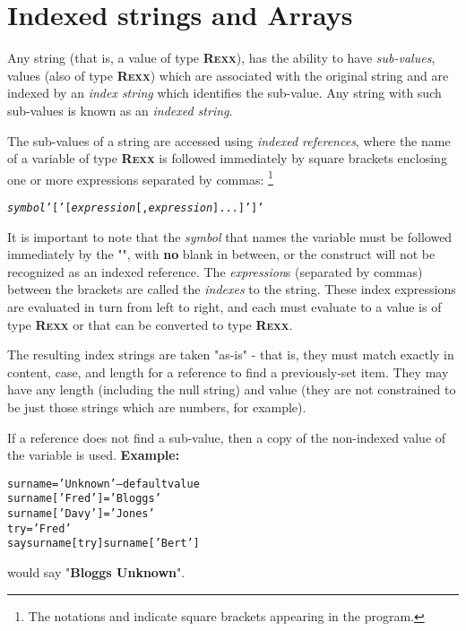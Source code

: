 \chapter{Indexed strings and Arrays}\label{refinstr}
 
Any \nr{} string (that is, a value of type \textbf{R\textsc{exx}}), has the
ability to have \emph{sub-values}, values (also of type \textbf{R\textsc{exx}})
which are associated with the original string and are indexed by an
\emph{index string} which identifies the sub-value.
Any string with such sub-values is known as an \emph{indexed string}.
 
The sub-values of a \nr{} string are accessed using \emph{indexed
references}, where the name of a variable of type \textbf{R\textsc{exx}} is
followed immediately by square brackets enclosing one or more
expressions separated by commas:
\footnote{
The notations \keyword{'['} and \keyword{']'}
indicate square brackets appearing in the \nr{} program.
}
\begin{shaded}
\begin{alltt}
\emph{symbol}'['[\emph{expression}[, \emph{expression}]...]']'
\end{alltt}
\end{shaded}
It is important to note that the \emph{symbol} that names the
variable must be followed immediately by the "\keyword{[}",
with \textbf{no} blank in between, or the construct will not be
recognized as an indexed reference.
 The \emph{expression}s (separated by commas) between the
brackets are called the \emph{indexes} to the string.
These index expressions are evaluated in turn from left to right, and
each must evaluate to a value is of type \textbf{R\textsc{exx}} or that can be
converted to type \textbf{R\textsc{exx}}.
 
The resulting index strings are taken "as-is" - that is, they
must match exactly in content, case, and length for a reference to find
a previously-set item.
They may have any length (including the null string) and value (they are
not constrained to be just those strings which are numbers, for
example).
 
If a reference does not find a sub-value, then a copy of the non-indexed
value of the variable is used.
 \textbf{Example:}
\begin{alltt}
surname='Unknown'         -- default value
surname['Fred']='Bloggs'
surname['Davy']='Jones'
try='Fred'
say surname[try] surname['Bert']
\end{alltt}
would say "\textbf{Bloggs Unknown}".
 
